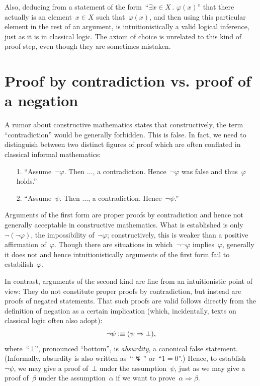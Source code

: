 \documentclass[10pt,reqno,a4paper,openany]{amsbook}
\theoremstyle{definition}
\theoremstyle{plain}
\theoremstyle{remark}
\newcommand{\?}{\,{:}\,}
\renewcommand{\_}{\mathpunct{.}\,}
\newcommand{\defequiv}{\vcentcolon\equiv}
\begin{document}
Also, deducing from a statement of the form~``$\exists x \in X\_ \varphi(x)$''
that there actually is an element~$x \in X$ such that~$\varphi(x)$, and then
using this particular element in the rest of an argument, is intuitionistically a
valid logical inference, just as it is in classical logic. The axiom of choice
is unrelated to this kind of proof step, even though they are sometimes
mistaken.


\section{Proof by contradiction vs. proof of a negation}

A rumor about constructive mathematics states that constructively, the term
``contradiction'' would be generally forbidden. This is false. In fact, we need
to distinguish between two distinct figures of proof which are often conflated
in classical informal mathematics:

\begin{enumerate}
\item[1.] ``Assume~$\neg\varphi$. Then $\ldots$, a contradiction.
Hence~$\neg\varphi$ was false and thus~$\varphi$ holds.''
\item[2.] ``Assume~$\psi$. Then $\ldots$, a contradiction. Hence~$\neg\psi$.''
\end{enumerate}

Arguments of the first form are proper proofs by contradiction and hence not
generally acceptable in constructive mathematics. What is established is
only~$\neg(\neg\varphi)$, the impossibility of~$\neg\varphi$; constructively,
this is weaker than a positive affirmation of~$\varphi$. Though there are
situations in which~$\neg\neg\varphi$ implies~$\varphi$, generally it does not
and hence intuitionistically arguments of the first form fail to
estabilish~$\varphi$.

In contrast, arguments of the second kind are fine from an intuitionistic point
of view: They do not constitute proper proofs by contradiction, but instead are proofs of negated
statements. That such proofs are valid follows directly from the definition of
negation as a certain
implication (which, incidentally, texts on classical logic often also adopt):
\[ \neg\psi \defequiv (\psi \Rightarrow \bot), \]
where~``$\bot$'', pronounced ``bottom'', is \emph{absurdity}, a canonical false
statement. (Informally, absurdity is also written as~``$\lightning$'' or~``$1 = 0$''.)
Hence, to establish~$\neg\psi$, we may give a proof of~$\bot$ under
the assumption~$\psi$, just as we may give a proof of~$\beta$ under the
assumption~$\alpha$ if we want to prove~$\alpha \Rightarrow \beta$.
\end{document}
